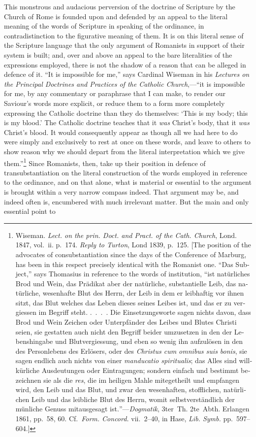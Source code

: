 \documentclass[
  english,
]{book}
\providecommand{\textlatin}{}
\renewcommand{\textlatin}[2][]{\foreignlanguage{latin}{#2}}
\newcommand{\textgerman}[2][]{\foreignlanguage{ngerman}{#2}}
\begin{document}
This monstrous and audacious perversion of the doctrine of Scripture by the Church of Rome is founded upon and defended by an appeal to the literal meaning of the words of Scripture in speaking of the ordinance, in contradistinction to the figurative meaning of them. It is on this literal sense of the Scripture language that the only argument of Romanists in support of their system is built; and, over and above an appeal to the bare literalities of the expressions employed, there is not the shadow of a reason that can be alleged in defence of it. ``It is impossible for me,'' says Cardinal Wiseman in his \emph{Lectures on the Principal Doctrines and Practices of the Catholic Church},---``it is impossible for me, by any commentary or paraphrase that I can make, to render our Saviour's words more explicit, or reduce them to a form more completely expressing the Catholic doctrine than they do themselves: `This is my body; this is my blood.' The Catholic doctrine teaches that it \emph{was} Christ's body, that it \emph{was} Christ's blood. It would consequently appear as though all we had here to do were simply and exclusively to rest at once on these words, and leave to others to show reason why we should depart from the literal interpretation which we give them.''\footnote{Wiseman. \emph{Lect. on the prin. Doct. and Pract. of the Cath. Church}, Lond. 1847, vol.~ii. p.~174. \emph{Reply to Turton}, Lond 1839, p.~125. {[}The position of the advocates of consubstantiation since the days of the Conference of Marburg, has been in this respect precisely identical with the Romanist one. ``\textgerman{Das Subject},'' says Thomasius in reference to the words of institution, ``\textgerman{ist natürliches Brod und Wein, das Prädikat aber der natürliche, substantielle Leib, das natürliche, wesenhafte Blut des Herrn, der Leib in dem er leibhaftig vor ihnen sitzt, das Blut welches das Leben dieses seines Leibes ist, und das er zu vergiessen im Begriff steht. .~.~.~. Die Einsetzungsworte sagen nichts davon, dass Brod und Wein Zeichen oder Unterpfänder des Leibes und Blutes Christi seien, sie gestatten auch nicht den Begriff beider umzusetzen in den der Lebenshingabe und Blutvergiessung, und eben so wenig ihn aufzulösen in den des Personlebens des Erlösers, oder des \textlatin{\emph{Christus cum omnibus suis bonis}}, sie sagen endlich auch nichts von einer \textlatin{\emph{manducatio spiritualis}}; das Alles sind willkürliche Ausdeutungen oder Eintragungen; sondern einfach und bestimmt bezeichnen sie als die \textlatin{\emph{res}}, die im heiligen Mahle mitegetheilt und empfangen wird, den Leib und das Blut, und zwar den wesenhaften, stofflichen, natürlichen Leib und das leibliche Blut des Herrn, womit selbstverständlich der münliche Genuss mitausgesagt ist.}''---\emph{Dogmatik}, 3ter~Th. 2te~Abth. Erlangen 1861, pp.~58, 60. Cf.~\emph{Form. Concord.} vii.~2--40, in Hase, \emph{Lib. Symb.} pp.~597--604.{]}} Since Romanists, then, take up their position in defence of transubstantiation on the literal construction of the words employed in reference to the ordinance, and on that alone, what is material or essential to the argument is brought within a very narrow compass indeed. That argument may be, and indeed often is, encumbered with much irrelevant matter. But the main and only essential point to 
\end{document}
